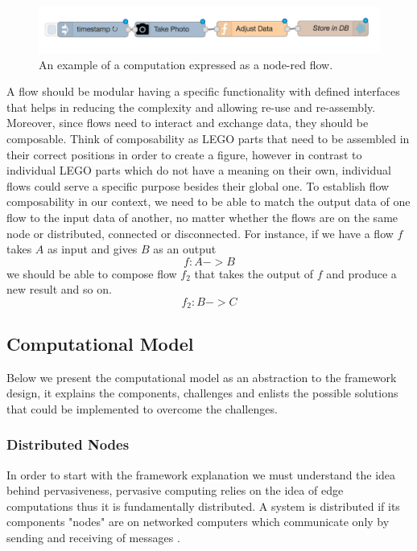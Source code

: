 \begin{figure}[H]
	\centering
	\includegraphics[scale=0.5]{images/db-out.png} 
	\caption{An example of a computation expressed as a node-red flow.}
	\label{fig:flow}
\end{figure}

 A flow should be modular having a specific functionality with defined interfaces that helps in reducing the complexity and allowing re-use and re-assembly. Moreover, since flows need to interact and exchange data, they should be composable. Think of composability as LEGO parts that need to be assembled in their correct positions in order to create a figure, however in contrast to individual LEGO parts which do not have a meaning on their own, individual flows could serve a specific purpose besides their global one. To establish flow composability in our context, we need to be able to match the output data of one flow to the input data of another, no matter whether the flows are on the same node or distributed, connected or disconnected. For instance, if we have a flow \(f\) takes \(A\) as input and gives \(B\) as an output
\[ f : A  -> B  \]
we should be able to compose flow \(f_2\) that takes the output of \(f\) and produce a new result and so on. 
\[ f_2 : B  -> C  \]

\subsection{Computational Model}

Below we present the computational model as an abstraction to the framework design, it explains the components, challenges and enlists the possible solutions that could be implemented to overcome the challenges. 	

\subsubsection{Distributed Nodes}
In order to start with the framework explanation we must understand the idea behind pervasiveness, pervasive computing relies on the idea of edge computations thus it is fundamentally distributed.  A system is distributed if its components "nodes" are on networked computers which communicate only by sending and receiving of messages \cite{DSYS}. 


